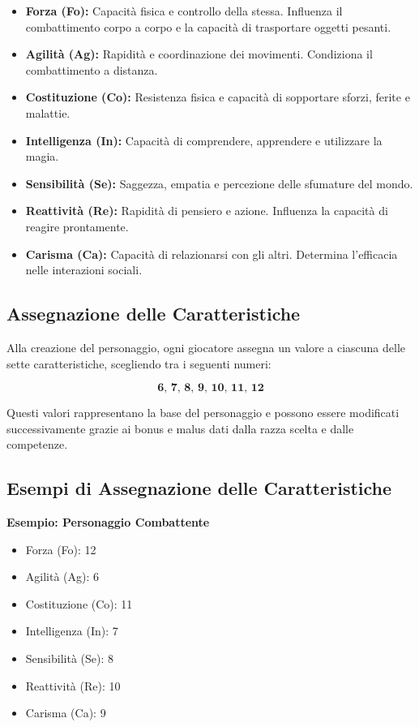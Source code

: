 \documentclass[../manuale_main.tex]{subfiles}
\begin{document}
\begin{itemize}
    \item \textbf{Forza (Fo):} Capacità fisica e controllo della stessa. Influenza il combattimento corpo a corpo e la capacità di trasportare oggetti pesanti.
    \item \textbf{Agilità (Ag):} Rapidità e coordinazione dei movimenti. Condiziona il combattimento a distanza.
    \item \textbf{Costituzione (Co):} Resistenza fisica e capacità di sopportare sforzi, ferite e malattie.
    \item \textbf{Intelligenza (In):} Capacità di comprendere, apprendere e utilizzare la magia.
    \item \textbf{Sensibilità (Se):} Saggezza, empatia e percezione delle sfumature del mondo.
    \item \textbf{Reattività (Re):} Rapidità di pensiero e azione. Influenza la capacità di reagire prontamente.
    \item \textbf{Carisma (Ca):} Capacità di relazionarsi con gli altri. Determina l’efficacia nelle interazioni sociali.
\end{itemize}

\subsection{Assegnazione delle Caratteristiche}
Alla creazione del personaggio, ogni giocatore assegna un valore a ciascuna delle sette caratteristiche, scegliendo tra i seguenti numeri:

\[
\textbf{6, 7, 8, 9, 10, 11, 12}
\]

Questi valori rappresentano la base del personaggio e possono essere modificati successivamente grazie ai bonus e malus dati dalla razza scelta e dalle competenze.

\vspace{0.3cm}

\subsection{Esempi di Assegnazione delle Caratteristiche}
\textbf{Esempio: Personaggio Combattente}
\begin{itemize}
    \item Forza (Fo): 12
    \item Agilità (Ag): 6
    \item Costituzione (Co): 11
    \item Intelligenza (In): 7
    \item Sensibilità (Se): 8
    \item Reattività (Re): 10
    \item Carisma (Ca): 9
\end{itemize}
\end{document}
